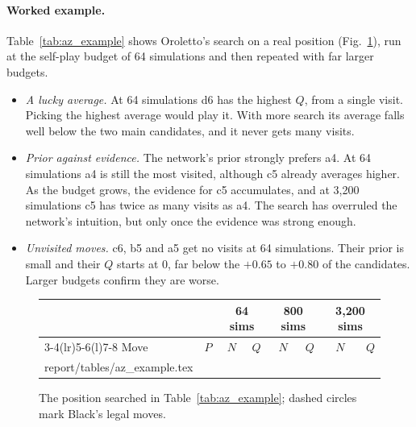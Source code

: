 \documentclass[11pt]{article}
\makeatletter
\newcommand{\tabinput}[1]{\@@input #1 }
\makeatother
\begin{document}
\paragraph{Worked example.} Table~\ref{tab:az_example} shows Oroletto's search
on a real position (Fig.~\ref{fig:az_example}), run at the self-play budget of
64 simulations and then repeated with far larger budgets.
\begin{itemize}[leftmargin=*]
  \item \emph{A lucky average.} At 64 simulations d6 has the highest $Q$, from a
        single visit. Picking the highest average would play it. With more
        search its average falls well below the two main candidates, and it
        never gets many visits.
  \item \emph{Prior against evidence.} The network's prior strongly prefers a4.
        At 64 simulations a4 is still the most visited, although c5 already
        averages higher. As the budget grows, the evidence for c5 accumulates,
        and at 3{,}200 simulations c5 has twice as many visits as a4. The search
        has overruled the network's intuition, but only once the evidence was
        strong enough.
  \item \emph{Unvisited moves.} c6, b5 and a5 get no visits at 64
        simulations. Their prior is small and their $Q$ starts at 0, far below
        the $+0.65$ to $+0.80$ of the candidates. Larger budgets confirm they are
        worse.
\end{itemize}

\begin{figure}[H]
\centering
\begin{minipage}[c]{0.34\linewidth}\centering

\end{minipage}\hfill
\begin{minipage}[c]{0.63\linewidth}\centering
\small
{}
\label{tab:az_example}
\begin{tabular}{@{}lrrrrrrr@{}}
\toprule
 & & \multicolumn{2}{c}{64 sims} & \multicolumn{2}{c}{800 sims} & \multicolumn{2}{c}{3{,}200 sims} \\
\cmidrule(lr){3-4}\cmidrule(lr){5-6}\cmidrule(l){7-8}
Move & $P$ & $N$ & $Q$ & $N$ & $Q$ & $N$ & $Q$ \\
\midrule
\tabinput{report/tables/az_example.tex}
\bottomrule
\end{tabular}
\end{minipage}
\caption{The position searched in Table~\ref{tab:az_example}; dashed circles mark
Black's legal moves.}
\label{fig:az_example}
\end{figure}
\end{document}
